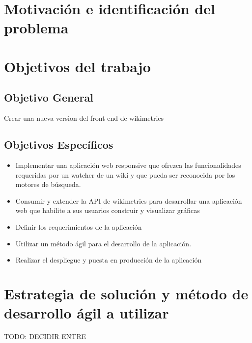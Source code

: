 

\section{Motivación e identificación del problema}

\section{Objetivos del trabajo}

\subsection{Objetivo General}

Crear una nueva version del front-end de wikimetrics

\subsection{Objetivos Específicos}


\begin{itemize}{}{}

    \item Implementar una aplicación web responsive que ofrezca las funcionalidades requeridas por un watcher de un wiki y que pueda ser reconocida por los motores de búsqueda.
    \item Consumir y extender la API de wikimetrics para desarrollar una aplicación web que habilite a sus usuarios construir y visualizar gráficas
    \item Definir los requerimientos de la aplicación
    \item Utilizar un método ágil para el desarrollo de la aplicación.
    \item Realizar el despliegue y puesta en producción de la aplicación

\end{itemize}

\section{Estrategia de solución y método de desarrollo ágil a utilizar}
    TODO: DECIDIR ENTRE

